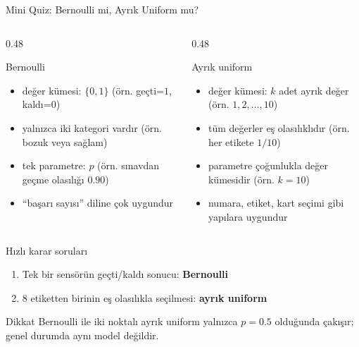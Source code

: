 \documentclass[light]{lutbeamer}
\begin{document}
\begin{frame}{Mini Quiz: Bernoulli mi, Ayrık Uniform mu?}
    \small
    \begin{columns}[T]
        \begin{column}{0.48\textwidth}
            \begin{block}{Bernoulli}
                \begin{itemize}
                    \item değer kümesi: \(\{0,1\}\) (örn. geçti=\(1\), kaldı=\(0\))
                    \item yalnızca iki kategori vardır (örn. bozuk veya sağlam)
                    \item tek parametre: \(p\) (örn. sınavdan geçme olasılığı \(0.90\))
                    \item ``başarı sayısı'' diline çok uygundur
                \end{itemize}
            \end{block}
        \end{column}
        \begin{column}{0.48\textwidth}
            \begin{block}{Ayrık uniform}
                \begin{itemize}
                    \item değer kümesi: \(k\) adet ayrık değer (örn. \(1,2,\dots,10\))
                    \item tüm değerler eş olasılıklıdır (örn. her etikete \(1/10\))
                    \item parametre çoğunlukla değer kümesidir (örn. \(k=10\))
                    \item numara, etiket, kart seçimi gibi yapılara uygundur
                \end{itemize}
            \end{block}
        \end{column}
    \end{columns}

    \begin{exampleblock}{Hızlı karar soruları}
        \begin{enumerate}
            \item Tek bir sensörün geçti/kaldı sonucu: \textbf{Bernoulli}
            \item \(8\) etiketten birinin eş olasılıkla seçilmesi: \textbf{ayrık uniform}
        \end{enumerate}
    \end{exampleblock}

    \begin{alertblock}{Dikkat}
        Bernoulli ile iki noktalı ayrık uniform yalnızca \(p=0.5\) olduğunda çakışır; genel durumda aynı model değildir.
    \end{alertblock}
\end{frame}
\end{document}
